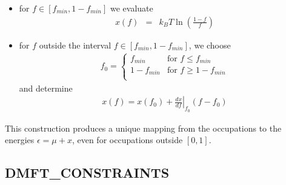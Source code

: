 \documentclass[11pt,a4paper]{report}
\begin{document}
\begin{itemize}
\item for $f\in[f_{min},1-f_{min}]$ we evaluate
\begin{eqnarray}
  x(f)&=&k_BT\ln\left(\frac{1-f}{f}\right)
\end{eqnarray}
%
\item for $f$ outside the interval $f\in[f_{min},1-f_{min}]$, we choose
\begin{eqnarray}
f_0=\begin{cases}
f_{min}&\text{for $f\le f_{min}$}\\
1-f_{min}&\text{for $f\ge 1-f_{min}$}\\
\end{cases}
\end{eqnarray}
and determine 
\begin{eqnarray}
x(f)=x(f_0)+\left.\frac{dx}{df}\right|_{f_0}(f-f_0)
\end{eqnarray}
\end{itemize}
This construction produces a unique mapping from the occupations to
the energies $\epsilon=\mu+x$, even for occupations outside $[0,1]$.


\subsection{DMFT\_CONSTRAINTS}
\label{sec:routinedmftconstraints}
\end{document}
